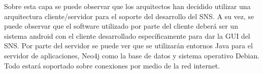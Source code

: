 Sobre esta capa se puede observar que los arquitectos han decidido utilizar una arquitectura cliente/servidor para el soporte del desarrollo del SNS. A su vez, se puede observar que el software utilizado por parte del cliente deberá ser un sistema android con el cliente desarrollado específicamente para dar la GUI del SNS. Por parte del servidor se puede ver que se utilizarán entornos Java para el servidor de aplicaciones, Neo4j como la base de datos y sistema operativo Debian. Todo estará soportado sobre conexiones por medio de la red internet.